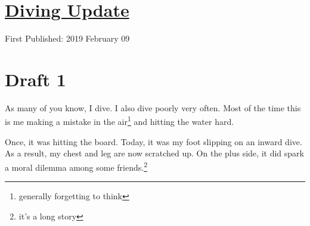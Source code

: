 \documentclass[12pt]{article}[titlepage]
\newcommand{\1}{\={a}}
\newcommand{\2}{\={e}}
\newcommand{\3}{\={\i}}
\newcommand{\4}{\=o}
\newcommand{\5}{\=u}
\newcommand{\6}{\={A}}
\renewcommand{\,}{\textsuperscript{,}}
\begin{document}
\doublespacing
\section{\href{diving-9-feb.html}{Diving Update}}
First Published: 2019 February 09

\section{Draft 1}
As many of you know, I dive.
I also dive poorly very often.
Most of the time this is me making a mistake in the air\footnote{generally forgetting to think} and hitting the water hard.

Once, it was hitting the board.
Today, it was my foot slipping on an inward dive.
As a result, my chest and leg are now scratched up.
On the plus side, it did spark a moral dilemma among some friends.\footnote{it's a long story}
\end{document}

